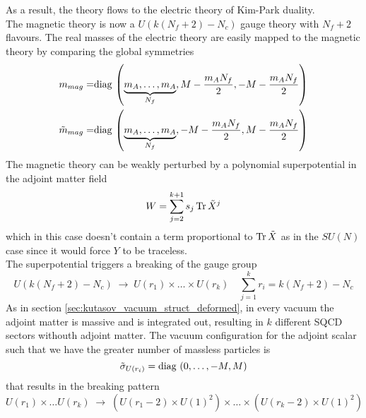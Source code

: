 As a result, the theory flows to the electric theory of Kim-Park duality.\\
The magnetic theory is now a $U(k(N_f + 2) - N_c)$ gauge theory with $N_f +2$ flavours. 
The real masses of the electric theory are easily mapped to the magnetic theory by comparing the global symmetries
\begin{align}
 m_{mag} =&    \hbox{diag\,} \left(  \underbrace{m_A , \dotsc, m_A}_{N_f} ,  M- \frac{m_A N_f}{2} , -M -\frac{m_A N_f}{2}\right)  \\
  \tilde{m}_{mag} =& \hbox{diag\,} \left(
  \underbrace{
  m_A,\dotsc,m_A
}_{N_f}
  , -M - \frac{m_A N_f}{2}, M - \frac{m_A N_f}{2}\right)
\end{align}
%
%
The magnetic theory can be weakly perturbed by a polynomial superpotential in the adjoint matter field
\begin{equation}
W = \sum_{j=2}^{k+1} s_j \, \mathrm{Tr } \,{\tilde{X}^{j}}
\end{equation}
which in this case doesn't contain a term proportional to $\mathrm{Tr } \,{\tilde{X}}$ as in the $SU(N) $ case since it would force $Y$ to be traceless.\\
The superpotential triggers a breaking of the gauge group 
\begin{equation}
 U(k (N_f + 2) - N_c ) \; \longrightarrow \; U(r_1) \times \dots \times U(r_k) \quad \sum_{j=1}^k r_i = k (N_f + 2) - N_c
  \end{equation}
As in section \ref{sec:kutasov_vacuum_struct_deformed}, in every vacuum the adjoint matter is massive and is integrated out, resulting in $k$ different SQCD sectors withouth adjoint matter.
The vacuum configuration for the adjoint scalar such that we have the greater number of massless particles is
\begin{equation}
   \tilde{\sigma}_{U(r_i)} = \hbox{diag\,} \left(  0, \dots, - M , M \right)
  \end{equation}
that results in the breaking pattern
\begin{equation}
U(r_1) \times \dots U(r_k) \; \longrightarrow \; \left( U(r_1-2) \times U(1)^2 \right) \times  \dots \times \left( U(r_k-2) \times U(1)^2 \right) 
\end{equation}
